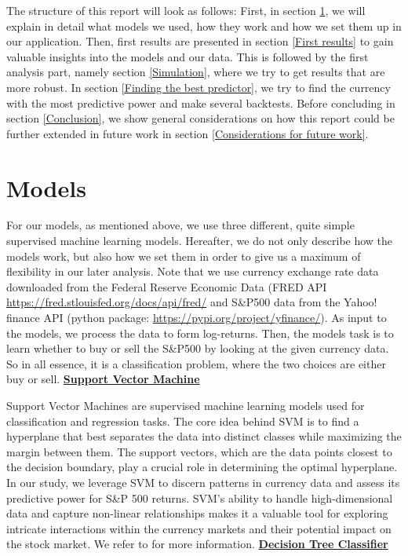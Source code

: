The structure of this report will look as follows: First, in section \ref{models}, we will explain in detail what models we used, how they work and how we set them up in our application. Then, first results are presented in section \ref{First results} to gain valuable insights into the models and our data. This is followed by the first analysis part, namely section \ref{Simulation}, where we try to get results that are more robust. In section \ref{Finding the best predictor}, we try to find the currency with the most predictive power and make several backtests. Before concluding in section \ref{Conclusion}, we show general considerations on how this report could be further extended in future work in section \ref{Considerations for future work}.

\section{Models}
\label{models}
For our models, as mentioned above, we use three different, quite simple supervised machine learning models. Hereafter, we do not only describe how the models work, but also how we set them in order to give us a maximum of flexibility in our later analysis. Note that we use currency exchange rate data downloaded from the Federal Reserve Economic Data (\gls{FRED} API \url{https://fred.stlouisfed.org/docs/api/fred/} and S\&P500 data from the Yahoo! finance API (python package: \url{https://pypi.org/project/yfinance/}). As input to the models, we process the data to form log-returns. Then, the models task is to learn whether to buy or sell the S\&P500 by looking at the given currency data. So in all essence, it is a classification problem, where the two choices are either buy or sell.
\newline
\newline
\underline{\textbf{Support Vector Machine}}

\noindent Support Vector Machines are supervised machine learning models used for classification and regression tasks. The core idea behind SVM is to find a hyperplane that best separates the data into distinct classes while maximizing the margin between them. The support vectors, which are the data points closest to the decision boundary, play a crucial role in determining the optimal hyperplane. In our study, we leverage SVM to discern patterns in currency data and assess its predictive power for S&P 500 returns. SVM's ability to handle high-dimensional data and capture non-linear relationships makes it a valuable tool for exploring intricate interactions within the currency markets and their potential impact on the stock market. We refer to \cite{boseretal} for more information.
\newline
\newline
\underline{\textbf{Decision Tree Classifier}}

